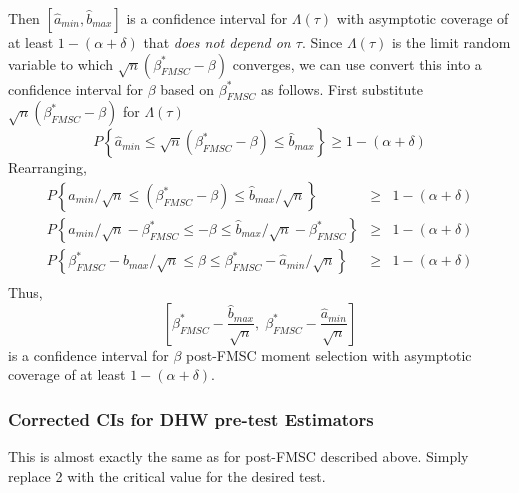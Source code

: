 \documentclass[12pt]{article}
\theoremstyle{definition}
\begin{document}
Then $[\widehat{a}_{min} , \widehat{b}_{max}]$ is a confidence interval for $\Lambda(\tau)$ with asymptotic coverage of at least $1 - (\alpha + \delta)$ that \emph{does not depend on $\tau$}. Since $\Lambda(\tau)$ is the limit random variable to which $\sqrt{n}(\beta^*_{FMSC} - \beta)$ converges, we can use convert this into a confidence interval for $\beta$ based on $\beta^*_{FMSC}$ as follows. First substitute $\sqrt{n}(\beta^*_{FMSC} - \beta)$ for $\Lambda(\tau)$
$$P\left\{ \widehat{a}_{min} \leq  \sqrt{n}(\beta^*_{FMSC} - \beta) \leq \widehat{b}_{max}\right\} \geq 1 - (\alpha + \delta)$$
Rearranging,
\begin{eqnarray*}
   P\left\{ \widehat{a}_{min}/\sqrt{n} \leq  (\beta^*_{FMSC} - \beta) \leq \widehat{b}_{max}/\sqrt{n}\right\} &\geq& 1 - (\alpha + \delta)\\ 
   P\left\{ \widehat{a}_{min}/\sqrt{n} - \beta^*_{FMSC}  \leq - \beta \leq \widehat{b}_{max}/\sqrt{n} - \beta^*_{FMSC}  \right\} &\geq& 1 - (\alpha + \delta)\\
P\left\{\beta^*_{FMSC} -  \widehat{b}_{max}/\sqrt{n}  \leq  \beta \leq \beta^*_{FMSC} - \widehat{a}_{min}/\sqrt{n} \right\} &\geq& 1 - (\alpha + \delta)\\
 \end{eqnarray*} 
Thus, 
  $$\left[ \beta^*_{FMSC}  - \frac{\widehat{b}_{max}}{\sqrt{n}}, \; \beta^*_{FMSC}  - \frac{\widehat{a}_{min}}{\sqrt{n}} \right]$$
is a confidence interval for $\beta$ post-FMSC moment selection with asymptotic coverage of at least $1 - (\alpha + \delta)$.


\subsubsection{Corrected CIs for DHW pre-test Estimators}
This is almost exactly the same as for post-FMSC described above. Simply replace 2 with the critical value for the desired test.
\end{document}

